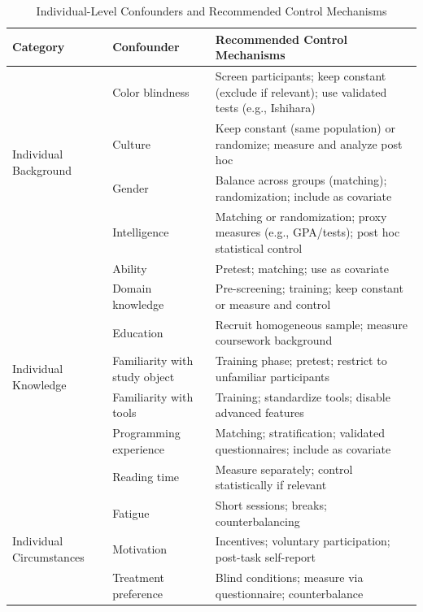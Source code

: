 \begin{table}[t]
\centering
\caption{Individual-Level Confounders and Recommended Control Mechanisms}
\label{tab:individual-confounders-control}
\begin{tabular}{p{4cm} p{5.5cm} p{6.5cm}}
\toprule
\textbf{Category} & \textbf{Confounder} & \textbf{Recommended Control Mechanisms} \\
\midrule

\multirow{4}{*}{Individual Background}
& Color blindness 
& Screen participants; keep constant (exclude if relevant); use validated tests (e.g., Ishihara) \\

& Culture 
& Keep constant (same population) or randomize; measure and analyze post hoc \\

& Gender 
& Balance across groups (matching); randomization; include as covariate \\

& Intelligence 
& Matching or randomization; proxy measures (e.g., GPA/tests); post hoc statistical control \\

\midrule

\multirow{7}{*}{Individual Knowledge}
& Ability 
& Pretest; matching; use as covariate \\

& Domain knowledge 
& Pre-screening; training; keep constant or measure and control \\

& Education 
& Recruit homogeneous sample; measure coursework background \\

& Familiarity with study object 
& Training phase; pretest; restrict to unfamiliar participants \\

& Familiarity with tools 
& Training; standardize tools; disable advanced features \\

& Programming experience 
& Matching; stratification; validated questionnaires; include as covariate \\

& Reading time 
& Measure separately; control statistically if relevant \\

\midrule

\multirow{3}{*}{Individual Circumstances}
& Fatigue 
& Short sessions; breaks; counterbalancing \\

& Motivation 
& Incentives; voluntary participation; post-task self-report \\

& Treatment preference 
& Blind conditions; measure via questionnaire; counterbalance \\

\bottomrule
\end{tabular}
\end{table}


